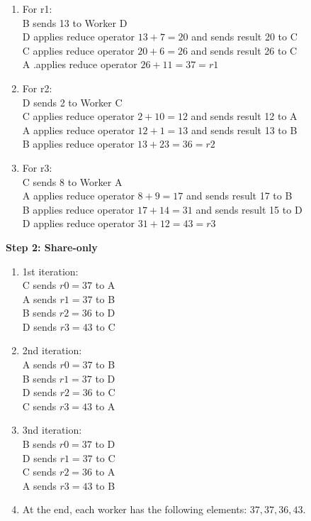 \documentclass[12pt]{article}
\begin{document}
\begin{enumerate}
\begin{enumerate}
	\item For r1:\\
	B sends 13 to Worker D\\
	D applies reduce operator $13 + 7 = 20$ and sends result 20 to C\\
	C applies reduce operator $20 + 6 = 26$ and sends result 26 to C\\
	A .applies reduce operator $26 + 11 = 37 = r1$
	
	\item For r2:\\
	D sends 2 to Worker C\\
	C applies reduce operator $2 + 10 = 12$ and sends result 12 to A\\
	A applies reduce operator $12 + 1 = 13$ and sends result 13 to B\\
	B applies reduce operator $13 + 23 = 36 = r2$
	
	\item For r3:\\	
	C sends 8 to Worker A\\
	A applies reduce operator $8 + 9 = 17$ and sends result 17 to B\\
	B applies reduce operator $17 + 14 = 31$ and sends result 15 to D\\
	D applies reduce operator $31 + 12 = 43 = r3$
\end{enumerate}

\textbf{Step 2: Share-only}
\begin{enumerate}
	\item 1st iteration:\\
	C sends $r0 = 37$ to A\\
	A sends $r1 = 37$ to B\\
	B sends $r2 = 36$ to D\\
	D sends $r3 = 43$ to C

	\item 2nd iteration:\\
	A sends $r0 = 37$ to B\\
	B sends $r1 = 37$ to D\\
	D sends $r2 = 36$ to C\\
	C sends $r3 = 43$ to A	
	
	\item 3nd iteration:\\
	B sends $r0 = 37$ to D\\
	D sends $r1 = 37$ to C\\
	C sends $r2 = 36$ to A\\
	A sends $r3 = 43$ to B	
	
	\item At the end, each worker has the following elements: $37, 37, 36, 43$.
\end{enumerate}
\end{enumerate}
\end{document}
